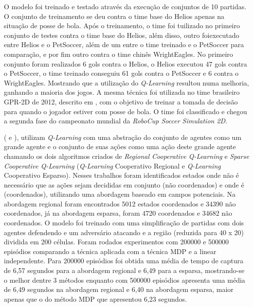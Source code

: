 O modelo foi treinado e testado através da execução de conjuntos de 10 partidas. O conjunto de
treinamento se  deu contra o time base do Helios apenas na situação de posse de bola. Após o
treinamento, o time foi tuilizado no primeiro conjunto de testes contra o time base do Helios, além
disso, outro foiexecutado entre Helios e o PetSoccer, além de um entre o time treinado e o PetSoccer
para comparação, e por fim outro contra o time chinês WrightEagles. No primeiro conjunto foram
realizados 6 gols contra o Helios, o Helios executou 47 gols contra o PetSoccer, o time treinado
conseguiu 61  gols contra o PetSoccer e 6 contra o WrightEagles. Mostrando que a utilização do
\textit{Q-Learning} resultou numa melhoria, ganhando a maioria dos jogos. A mesma técnica foi
utilizada no time brasileiro GPR-2D de 2012, descrito em , com o objetivo de
treinar a tomada de decisão para quando o jogador estiver com posse de bola. O time foi classificado
e chegou a segunda fase do campeonato mundial da \textit{RoboCup Soccer Simulation 2D}.

 (\citeyear{liu2008regional} e \citeyear{liu2009sparse}), utilizam
\textit{Q-Learning} com uma abstração do conjunto de agentes como um grande agente e o conjunto de
suas ações como uma ação deste grande agente chamando os dois algoritmos criados de \textit{Regional
Cooperative Q-Learning} e \textit{Sparse Cooperative Q-Learning} (\textit{Q-Learning} Cooperativo
Regional e \textit{Q-Learning} Cooperativo Esparso). Nesses trabalhos foram identificados estados
onde não é necessário que as ações sejam decididas em conjunto (não coordenados) e onde é
(coordenados), utilizando uma abordagem baseado em campos potenciais. Na abordagem regional foram
encontrados 5012 estados coordenados e 34390 não coordenados, já na abordagem esparsa, foram 4720
coordenados e 34682 não coordenados. O modelo foi treinado  com uma simplificação de partidas com
dois agentes defendendo e um adversário atacando e a região (reduzida para 40 x 20) dividida em 200
células. Foram rodados experimentos com 200000 e 500000 episódios comparando a técnica aplicada com
a técnica MDP e a linear independente. Para 200000 episódios foi obtida uma média de tempo de
captura de 6,57 segundos para a abordagem regional e 6,49 para a esparsa, mostrando-se o melhor
dentre 3 métodos enquanto com 500000 episódios apresenta uma média de 6,49 segundos na abordagem
regional e 6,40 na abordagem esparsa, maior apenas que o do método MDP que apresentou 6,23 segundos.

